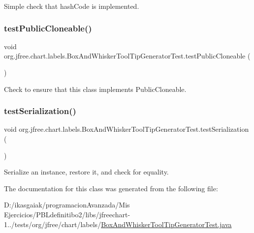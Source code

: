 Simple check that hash\+Code is implemented. \mbox{\label{classorg_1_1jfree_1_1chart_1_1labels_1_1_box_and_whisker_tool_tip_generator_test_a3b63ab7ceee1456023ad684700f7c0dd}} 
\subsubsection{\texorpdfstring{test\+Public\+Cloneable()}{testPublicCloneable()}}
{\footnotesize\ttfamily void org.\+jfree.\+chart.\+labels.\+Box\+And\+Whisker\+Tool\+Tip\+Generator\+Test.\+test\+Public\+Cloneable (\begin{DoxyParamCaption}{ }\end{DoxyParamCaption})}

Check to ensure that this class implements Public\+Cloneable. \mbox{\label{classorg_1_1jfree_1_1chart_1_1labels_1_1_box_and_whisker_tool_tip_generator_test_a50c2e4d539721899a710a592e0090873}} 
\subsubsection{\texorpdfstring{test\+Serialization()}{testSerialization()}}
{\footnotesize\ttfamily void org.\+jfree.\+chart.\+labels.\+Box\+And\+Whisker\+Tool\+Tip\+Generator\+Test.\+test\+Serialization (\begin{DoxyParamCaption}{ }\end{DoxyParamCaption})}

Serialize an instance, restore it, and check for equality. 

The documentation for this class was generated from the following file\+:\begin{DoxyCompactItemize}
\item 
D\+:/ikasgaiak/programacion\+Avanzada/\+Mis Ejercicios/\+P\+B\+Ldefinitibo2/libs/jfreechart-\/1../tests/org/jfree/chart/labels/\mbox{\hyperlink{_box_and_whisker_tool_tip_generator_test_8java}{Box\+And\+Whisker\+Tool\+Tip\+Generator\+Test.\+java}}\end{DoxyCompactItemize}
